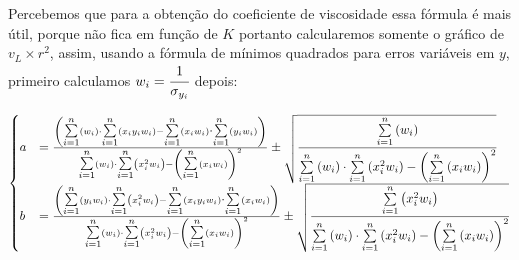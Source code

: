 \documentclass[english,brazil]{article}
\begin{document}
			Percebemos que para a obtenção do coeficiente de viscosidade essa fórmula é mais útil, porque não fica em função de $K$ portanto calcularemos somente o gráfico de $v_{L}\times r^{2}$, assim, usando a fórmula de mínimos quadrados para erros variáveis em $y$, primeiro calculamos $w_{i}=\cfrac{1}{\sigma_{y_{i}}}$ depois:

			\[
				\begin{cases}
					a & =\frac{\left({\displaystyle {\scriptscriptstyle {\textstyle \overset{n}{\underset{i=1}{\sum}}}}}\left(w_{i}\right)\cdot{\displaystyle {\scriptscriptstyle {\textstyle \overset{n}{\underset{i=1}{\sum}}}}}\left(x_{i}y_{i}w_{i}\right)-{\displaystyle {\scriptscriptstyle {\textstyle \overset{n}{\underset{i=1}{\sum}}}}}\left(x_{i}w_{i}\right){\scriptscriptstyle {\textstyle \overset{n}{\cdot\underset{i=1}{\sum}}}}\left(y_{i}w_{i}\right)\right)}{{\displaystyle {\scriptscriptstyle {\textstyle \overset{n}{\underset{i=1}{\sum}}}}}\left(w_{i}\right)\cdot{\displaystyle {\scriptscriptstyle {\textstyle \overset{n}{\underset{i=1}{\sum}}}}}\left(x_{i}^{2}w_{i}\right)-\left({\displaystyle {\scriptscriptstyle {\textstyle \overset{n}{\underset{i=1}{\sum}}}}}\left(x_{i}w_{i}\right)\right)^{2}}\pm\sqrt{\cfrac{{\displaystyle {\scriptscriptstyle {\textstyle \overset{n}{\underset{i=1}{\sum}}}}}\left(w_{i}\right)}{{\displaystyle {\scriptscriptstyle {\textstyle \overset{n}{\underset{i=1}{\sum}}}}}\left(w_{i}\right)\cdot{\displaystyle {\scriptscriptstyle {\textstyle \overset{n}{\underset{i=1}{\sum}}}}}\left(x_{i}^{2}w_{i}\right)-\left({\displaystyle {\scriptscriptstyle {\textstyle \overset{n}{\underset{i=1}{\sum}}}}}\left(x_{i}w_{i}\right)\right)^{2}}}\\
					b & =\frac{\left({\displaystyle {\scriptscriptstyle {\textstyle \overset{n}{\underset{i=1}{\sum}}}}}\left(y_{i}w_{i}\right)\cdot{\displaystyle {\scriptscriptstyle {\textstyle \overset{n}{\underset{i=1}{\sum}}}}}\left(x_{i}^{2}w_{i}\right)-{\displaystyle {\scriptscriptstyle {\textstyle \overset{n}{\underset{i=1}{\sum}}}}}\left(x_{i}y_{i}w_{i}\right){\scriptscriptstyle {\textstyle \overset{n}{\cdot\underset{i=1}{\sum}}}}\left(x_{i}w_{i}\right)\right)}{{\displaystyle {\scriptscriptstyle {\textstyle \overset{n}{\underset{i=1}{\sum}}}}}\left(w_{i}\right)\cdot{\displaystyle {\scriptscriptstyle {\textstyle \overset{n}{\underset{i=1}{\sum}}}}}\left(x_{i}^{2}w_{i}\right)-\left({\displaystyle {\scriptscriptstyle {\textstyle \overset{n}{\underset{i=1}{\sum}}}}}\left(x_{i}w_{i}\right)\right)^{2}}\pm\sqrt{\cfrac{{\displaystyle {\scriptscriptstyle {\textstyle \overset{n}{\underset{i=1}{\sum}}}}}\left(x_{i}^{2}w_{i}\right)}{{\displaystyle {\scriptscriptstyle {\textstyle \overset{n}{\underset{i=1}{\sum}}}}}\left(w_{i}\right)\cdot{\displaystyle {\scriptscriptstyle {\textstyle \overset{n}{\underset{i=1}{\sum}}}}}\left(x_{i}^{2}w_{i}\right)-\left({\displaystyle {\scriptscriptstyle {\textstyle \overset{n}{\underset{i=1}{\sum}}}}}\left(x_{i}w_{i}\right)\right)^{2}}}
				\end{cases}
			\]
\end{document}
